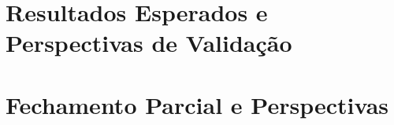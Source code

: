 \documentclass[tcc,baec]{unipampa}
\begin{document}
\chapter{Resultados Esperados e Perspectivas de Validação}
\label{cap-resultados-discussao}


\chapter{Fechamento Parcial e Perspectivas}
\label{cap-conclusao}


%
%












%
%
\end{document}
